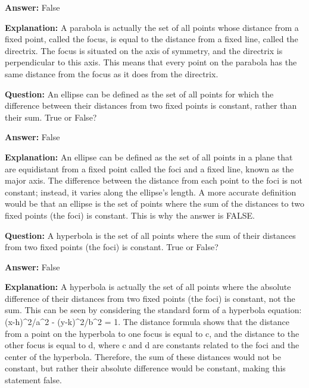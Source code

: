 \documentclass{article}
\begin{document}
                \textbf{Answer:} False

                \textbf{Explanation:} A parabola is actually the set of all points whose distance from a fixed point, called the focus, is equal to the distance from a fixed line, called the directrix. The focus is situated on the axis of symmetry, and the directrix is perpendicular to this axis. This means that every point on the parabola has the same distance from the focus as it does from the directrix.
                
                \vspace{0.5cm} 
        
            
                \textbf {Question:} An ellipse can be defined as the set of all points for which the difference between their distances from two fixed points is constant, rather than their sum. True or False?
                
                \textbf{Answer:} False

                \textbf{Explanation:} An ellipse can be defined as the set of all points in a plane that are equidistant from a fixed point called the foci and a fixed line, known as the major axis. The difference between the distance from each point to the foci is not constant; instead, it varies along the ellipse's length. A more accurate definition would be that an ellipse is the set of points where the sum of the distances to two fixed points (the foci) is constant. This is why the answer is FALSE.
                
                \vspace{0.5cm} 
        
            
                \textbf {Question:} A hyperbola is the set of all points where the sum of their distances from two fixed points (the foci) is constant. True or False?
                
                \textbf{Answer:} False

                \textbf{Explanation:} A hyperbola is actually the set of all points where the absolute difference of their distances from two fixed points (the foci) is constant, not the sum. This can be seen by considering the standard form of a hyperbola equation: (x-h){\textasciicircum}2/a{\textasciicircum}2 - (y-k){\textasciicircum}2/b{\textasciicircum}2 = 1. The distance formula shows that the distance from a point on the hyperbola to one focus is equal to c, and the distance to the other focus is equal to d, where c and d are constants related to the foci and the center of the hyperbola. Therefore, the sum of these distances would not be constant, but rather their absolute difference would be constant, making this statement false.
                
\end{document}
